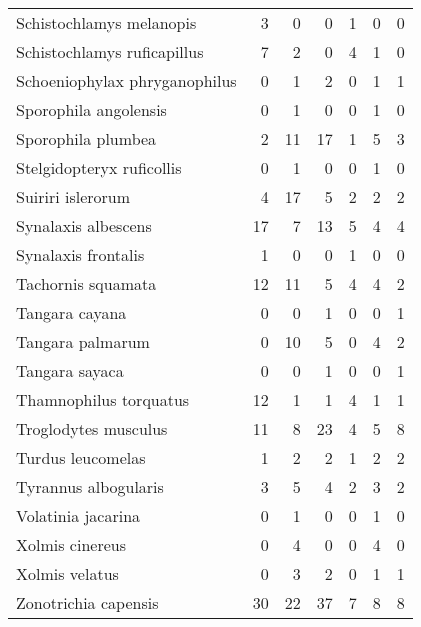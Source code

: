 \begin{table}
\begin{tabular}{lrrrrrr}
    Schistochlamys melanopis & 3 & 0 & 0 & 1 & 0 & 0 \\ 
    Schistochlamys ruficapillus & 7 & 2 & 0 & 4 & 1 & 0 \\ 
    Schoeniophylax phryganophilus & 0 & 1 & 2 & 0 & 1 & 1 \\ 
    Sporophila angolensis & 0 & 1 & 0 & 0 & 1 & 0 \\ 
    Sporophila plumbea & 2 & 11 & 17 & 1 & 5 & 3 \\ 
    Stelgidopteryx ruficollis & 0 & 1 & 0 & 0 & 1 & 0 \\ 
    Suiriri islerorum & 4 & 17 & 5 & 2 & 2 & 2 \\ 
    Synalaxis albescens & 17 & 7 & 13 & 5 & 4 & 4 \\ 
    Synalaxis frontalis & 1 & 0 & 0 & 1 & 0 & 0 \\ 
    Tachornis squamata & 12 & 11 & 5 & 4 & 4 & 2 \\ 
    Tangara cayana & 0 & 0 & 1 & 0 & 0 & 1 \\ 
    Tangara palmarum & 0 & 10 & 5 & 0 & 4 & 2 \\ 
    Tangara sayaca & 0 & 0 & 1 & 0 & 0 & 1 \\ 
    Thamnophilus torquatus & 12 & 1 & 1 & 4 & 1 & 1 \\ 
    Troglodytes musculus & 11 & 8 & 23 & 4 & 5 & 8 \\ 
    Turdus leucomelas & 1 & 2 & 2 & 1 & 2 & 2 \\ 
    Tyrannus albogularis & 3 & 5 & 4 & 2 & 3 & 2 \\ 
    Volatinia jacarina & 0 & 1 & 0 & 0 & 1 & 0 \\ 
    Xolmis cinereus & 0 & 4 & 0 & 0 & 4 & 0 \\ 
    Xolmis velatus & 0 & 3 & 2 & 0 & 1 & 1 \\ 
    Zonotrichia capensis & 30 & 22 & 37 & 7 & 8 & 8 \\ 
    \hline
  \end{tabular}
\end{table}
